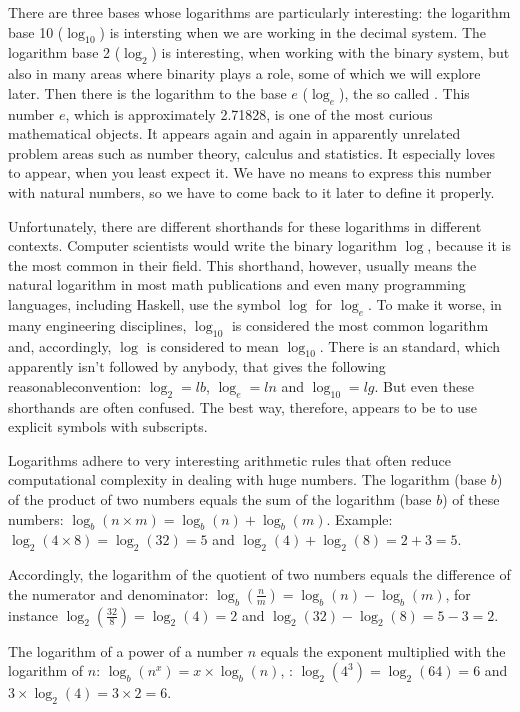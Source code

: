 \documentclass{scrreprt}
\begin{document}
There are three bases whose logarithms are
particularly interesting:
the logarithm base 10 ($\log_{10}$)
is intersting when we are working in the decimal
system.
The logarithm base 2 ($\log_2$)
is interesting,
when working with the binary system,
but also in many areas where binarity plays a role,
some of which we will explore later.
Then there is the logarithm to the base $e$ ($\log_e$),
the so called .
This number $e$, which is approximately 2.71828,
is one of the most curious mathematical objects.
It appears again and again in apparently unrelated 
problem areas such as number theory, calculus
and statistics. It especially loves to appear,
when you least expect it.
We have no means to express this number 
with natural numbers, so we have to come back to it later
to define it properly.

Unfortunately, there are different shorthands
for these logarithms
in different contexts.
Computer scientists would write the binary logarithm
$\log$, because it is the most common in their field.
This shorthand, however, usually means the natural logarithm
in most math publications and even many programming
languages, including Haskell, use the symbol $\log$
for $\log_e$.
To make it worse, in many engineering disciplines,
$\log_{10}$ is considered the most common logarithm
and, accordingly, $\log$ is considered to mean $\log_{10}$.
There is an  standard, which apparently isn't
followed by anybody, that gives the following
reasonableconvention: 
$\log_2 = lb$, $\log_e = ln$ and $\log_{10} = lg$.
But even these shorthands are often confused.
The best way, therefore, appears to be
to use explicit symbols with subscripts.

Logarithms adhere to very interesting arithmetic rules
that often reduce computational complexity in dealing
with huge numbers.
The logarithm (base $b$) of the product of two numbers
equals the sum of the logarithm (base $b$) of these numbers:
$\log_b(n \times m) = \log_b(n) + \log_b(m)$.
Example: $\log_2(4 \times 8) = \log_2(32) = 5$ and
$\log_2(4) + \log_2(8) = 2 + 3 = 5$.

Accordingly, the logarithm of the quotient of two numbers
equals the difference of the numerator and denominator:
$\log_b(\frac{n}{m}) = \log_b(n) - \log_b(m)$, for instance
$\log_2(\frac{32}{8}) = \log_2(4) = 2$ and
$\log_2(32) - \log_2(8) = 5 - 3 = 2$.

The logarithm of a power of a number $n$ 
equals the exponent multiplied with the logarithm of $n$:
$\log_b(n^x) = x \times \log_b(n)$, \eg:
$\log_2(4^3) = \log_2(64) = 6$ and
$3 \times \log_2(4) = 3 \times 2 = 6$.
\end{document}
